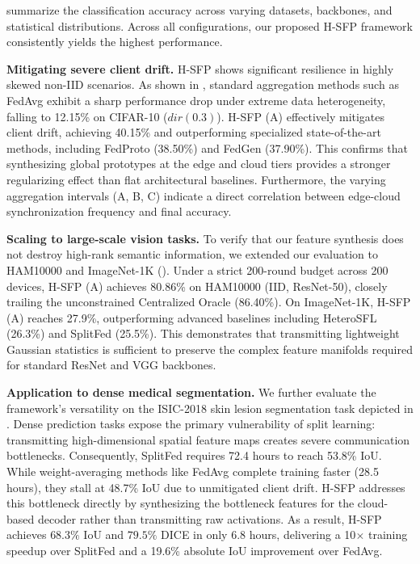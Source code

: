  summarize the classification accuracy across varying datasets, backbones, and statistical distributions. Across all configurations, our proposed H-SFP framework consistently yields the highest performance.

\noindent\textbf{Mitigating severe client drift.} H-SFP shows significant resilience in highly skewed non-IID scenarios. As shown in , standard aggregation methods such as FedAvg exhibit a sharp performance drop under extreme data heterogeneity, falling to 12.15\% on CIFAR-10 ($dir(0.3)$). H-SFP (A) effectively mitigates client drift, achieving 40.15\% and outperforming specialized state-of-the-art methods, including FedProto (38.50\%) and FedGen (37.90\%). This confirms that synthesizing global prototypes at the edge and cloud tiers provides a stronger regularizing effect than flat architectural baselines. Furthermore, the varying aggregation intervals (A, B, C) indicate a direct correlation between edge-cloud synchronization frequency and final accuracy.

\noindent\textbf{Scaling to large-scale vision tasks.} To verify that our feature synthesis does not destroy high-rank semantic information, we extended our evaluation to HAM10000 and ImageNet-1K (). Under a strict 200-round budget across 200 devices, H-SFP (A) achieves 80.86\% on HAM10000 (IID, ResNet-50), closely trailing the unconstrained Centralized Oracle (86.40\%). On ImageNet-1K, H-SFP (A) reaches 27.9\%, outperforming advanced baselines including HeteroSFL (26.3\%) and SplitFed (25.5\%). This demonstrates that transmitting lightweight Gaussian statistics is sufficient to preserve the complex feature manifolds required for standard ResNet and VGG backbones.

\noindent\textbf{Application to dense medical segmentation.} We further evaluate the framework's versatility on the ISIC-2018 skin lesion segmentation task depicted in . Dense prediction tasks expose the primary vulnerability of split learning: transmitting high-dimensional spatial feature maps creates severe communication bottlenecks. Consequently, SplitFed requires 72.4 hours to reach 53.8\% IoU. While weight-averaging methods like FedAvg complete training faster (28.5 hours), they stall at 48.7\% IoU due to unmitigated client drift. H-SFP addresses this bottleneck directly by synthesizing the bottleneck features for the cloud-based decoder rather than transmitting raw activations. As a result, H-SFP achieves $68.3\%$ IoU and $79.5\%$ DICE in only $6.8$ hours, delivering a 10$\times$ training speedup over SplitFed and a 19.6\% absolute IoU improvement over FedAvg.

